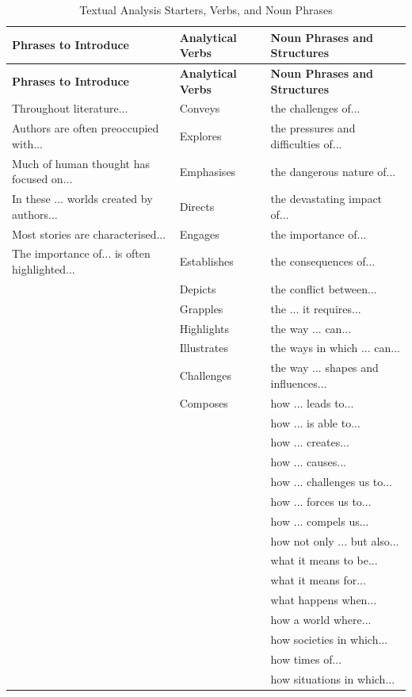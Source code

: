 \documentclass[a4paper]{article}
\begin{document}
\begin{longtable}{|p{4.5cm}|p{4.5cm}|p{6cm}|}
\caption{Textual Analysis Starters, Verbs, and Noun Phrases} \label{tab:analysislanguage} \\
\hline
\textbf{Phrases to Introduce} & \textbf{Analytical Verbs} & \textbf{Noun Phrases and Structures} \\
\hline
\endfirsthead

\hline
\textbf{Phrases to Introduce} & \textbf{Analytical Verbs} & \textbf{Noun Phrases and Structures} \\
\hline
\endhead

\hline
\endfoot

Throughout literature... & Conveys & the challenges of... \\
Authors are often preoccupied with... & Explores & the pressures and difficulties of... \\
Much of human thought has focused on... & Emphasises & the dangerous nature of... \\
In these ... worlds created by authors... & Directs & the devastating impact of... \\
Most stories are characterised... & Engages & the importance of... \\
The importance of... is often highlighted... & Establishes & the consequences of... \\
 & Depicts & the conflict between... \\
 & Grapples & the ... it requires... \\
 & Highlights & the way ... can... \\
 & Illustrates & the ways in which ... can... \\
 & Challenges & the way ... shapes and influences... \\
 & Composes & how ... leads to... \\
 & & how ... is able to... \\
 & & how ... creates... \\
 & & how ... causes... \\
 & & how ... challenges us to... \\
 & & how ... forces us to... \\
 & & how ... compels us... \\
 & & how not only ... but also... \\
 & & what it means to be... \\
 & & what it means for... \\
 & & what happens when... \\
 & & how a world where... \\
 & & how societies in which... \\
 & & how times of... \\
 & & how situations in which... \\
\hline

\end{longtable}
\end{document}
